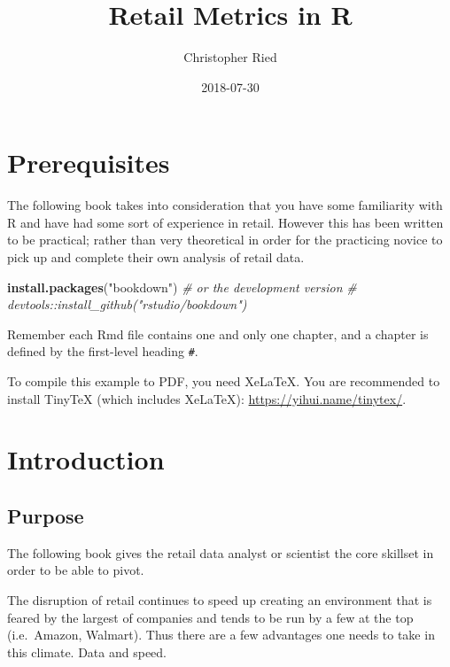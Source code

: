 \documentclass[]{book}
\title{Retail Metrics in R}
\author{Christopher Ried}
\date{2018-07-30}
\newenvironment{Shaded}{\begin{snugshade}}{\end{snugshade}}
\newcommand{\CommentTok}[1]{\textcolor[rgb]{0.56,0.35,0.01}{\textit{#1}}}
\newcommand{\KeywordTok}[1]{\textcolor[rgb]{0.13,0.29,0.53}{\textbf{#1}}}
\newcommand{\NormalTok}[1]{#1}
\newcommand{\StringTok}[1]{\textcolor[rgb]{0.31,0.60,0.02}{#1}}
\theoremstyle{definition}
\theoremstyle{definition}
\theoremstyle{definition}
\theoremstyle{remark}
\begin{document}
\maketitle

{
\setcounter{tocdepth}{1}
\tableofcontents
}
\hypertarget{prerequisites}{%
\chapter{Prerequisites}\label{prerequisites}}

The following book takes into consideration that you have some
familiarity with R and have had some sort of experience in retail.
However this has been written to be practical; rather than very
theoretical in order for the practicing novice to pick up and complete
their own analysis of retail data.

\begin{Shaded}
\begin{Highlighting}[]
\KeywordTok{install.packages}\NormalTok{(}\StringTok{"bookdown"}\NormalTok{)}
\CommentTok{# or the development version}
\CommentTok{# devtools::install_github("rstudio/bookdown")}
\end{Highlighting}
\end{Shaded}

Remember each Rmd file contains one and only one chapter, and a chapter
is defined by the first-level heading \texttt{\#}.

To compile this example to PDF, you need XeLaTeX. You are recommended to
install TinyTeX (which includes XeLaTeX):
\url{https://yihui.name/tinytex/}.

\hypertarget{intro}{%
\chapter{Introduction}\label{intro}}

\hypertarget{purpose}{%
\section{Purpose}\label{purpose}}

The following book gives the retail data analyst or scientist the core
skillset in order to be able to pivot.

The disruption of retail continues to speed up creating an environment
that is feared by the largest of companies and tends to be run by a few
at the top (i.e.~Amazon, Walmart). Thus there are a few advantages one
needs to take in this climate. Data and speed.
\end{document}
